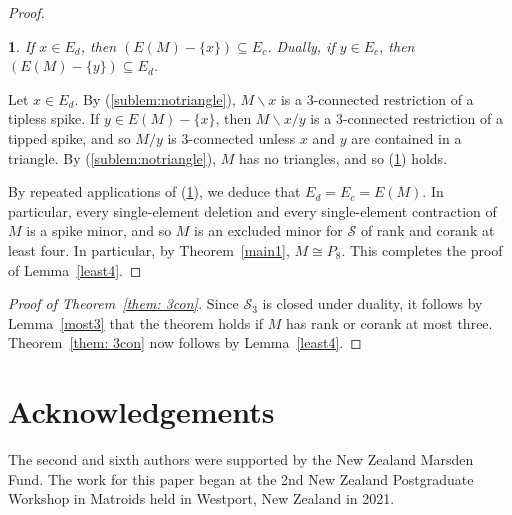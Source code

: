 \documentclass[11pt]{amsart}
\newtheorem{sublemma}{}[theorem]
\numberwithin{equation}{section} %
\newcommand{\cS}{\mathcal{S}}
\begin{document}
\begin{proof}
\begin{sublemma}
\label{sublem: Ed Ec}
If $x\in E_d$, then $(E(M)-\{x\})\subseteq E_c$. Dually, if $y\in E_c$, then $(E(M)-\{y\})\subseteq E_d$.
\end{sublemma}

Let $x\in E_d$. By (\ref{sublem:notriangle}), $M\backslash x$ is a $3$-connected restriction of a tipless spike. If $y\in E(M)-\{x\}$, then $M\backslash x/y$ is a $3$-connected restriction of a tipped spike, and so $M/y$ is $3$-connected unless $x$ and $y$ are contained in a triangle. By (\ref{sublem:notriangle}), $M$ has no triangles, and so (\ref{sublem: Ed Ec}) holds.

By repeated applications of (\ref{sublem: Ed Ec}), we deduce that $E_d=E_c=E(M)$. In particular, every single-element deletion and every single-element contraction of $M$ is a spike minor, and so $M$ is an excluded minor for $\cS$ of rank and corank at least four. In particular, by Theorem~\ref{main1}, $M\cong P_8$. This completes the proof of Lemma~\ref{least4}.
\end{proof}

\begin{proof}[Proof of Theorem~\ref{them: 3con}]
Since $\cS_3$ is closed under duality, it follows by Lemma~\ref{most3} that the theorem holds if $M$ has rank or corank at most three. Theorem~\ref{them: 3con} now follows by Lemma~\ref{least4}.
\end{proof}

\section*{Acknowledgements} The second and sixth authors were supported by the New Zealand Marsden Fund. The work for this paper began at the 2nd New Zealand Postgraduate Workshop in Matroids held in Westport, New Zealand in 2021.
\end{document}
